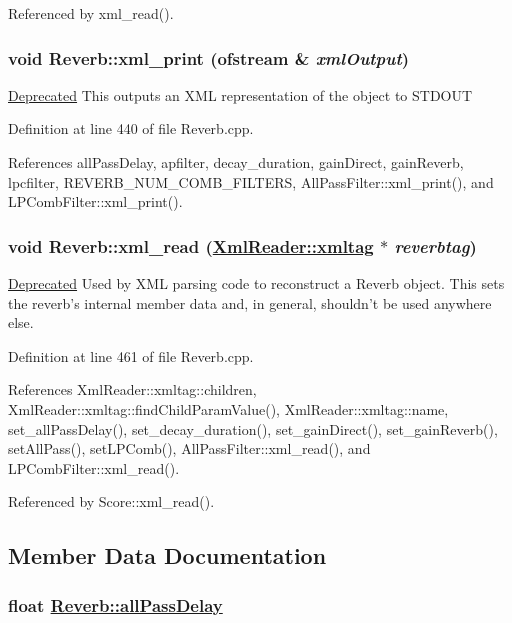 Referenced by xml\_\-read().\hypertarget{classReverb_a12}{
\subsubsection[xml\_\-print]{\setlength{\rightskip}{0pt plus 5cm}void Reverb::xml\_\-print (ofstream \& {\em xml\-Output})}}
\label{classReverb_a12}


\begin{Desc}
\item[\hyperlink{deprecated__deprecated000027}{Deprecated}]This outputs an XML representation of the object to STDOUT \end{Desc}


Definition at line 440 of file Reverb.cpp.

References all\-Pass\-Delay, apfilter, decay\_\-duration, gain\-Direct, gain\-Reverb, lpcfilter, REVERB\_\-NUM\_\-COMB\_\-FILTERS, All\-Pass\-Filter::xml\_\-print(), and LPComb\-Filter::xml\_\-print().\hypertarget{classReverb_a19}{
\subsubsection[xml\_\-read]{\setlength{\rightskip}{0pt plus 5cm}void Reverb::xml\_\-read (\hyperlink{classXmlReader_1_1xmltag}{Xml\-Reader::xmltag} $\ast$ {\em reverbtag})}}
\label{classReverb_a19}


\begin{Desc}
\item[\hyperlink{deprecated__deprecated000028}{Deprecated}]Used by XML parsing code to reconstruct a Reverb object. This sets the reverb's internal member data and, in general, shouldn't be used anywhere else. \end{Desc}


Definition at line 461 of file Reverb.cpp.

References Xml\-Reader::xmltag::children, Xml\-Reader::xmltag::find\-Child\-Param\-Value(), Xml\-Reader::xmltag::name, set\_\-all\-Pass\-Delay(), set\_\-decay\_\-duration(), set\_\-gain\-Direct(), set\_\-gain\-Reverb(), set\-All\-Pass(), set\-LPComb(), All\-Pass\-Filter::xml\_\-read(), and LPComb\-Filter::xml\_\-read().

Referenced by Score::xml\_\-read().

\subsection{Member Data Documentation}
\hypertarget{classReverb_r2}{
\subsubsection[allPassDelay]{\setlength{\rightskip}{0pt plus 5cm}float \hyperlink{classReverb_r2}{Reverb::all\-Pass\-Delay}}}
\label{classReverb_r2}




